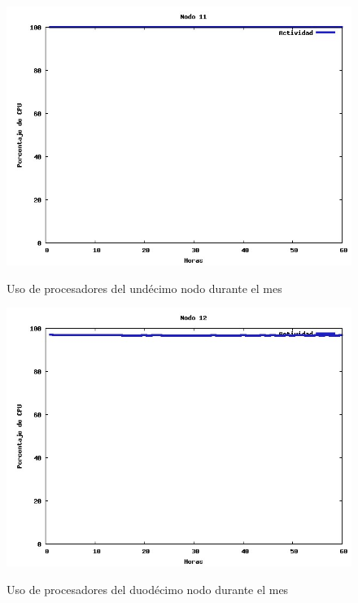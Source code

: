 \documentclass[11pt,a4paper,oneside,openany]{report}
\begin{document}
\begin{figure}[htb]
\centering
\includegraphics[width=0.9\linewidth]{grafico11.jpg}\\
\caption{Uso de procesadores del undécimo nodo durante el mes}
\end{figure}

\begin{figure}[htb]
\centering
\includegraphics[width=0.9\linewidth]{grafico12.jpg}\\
\caption{Uso de procesadores del duodécimo nodo durante el mes}
\end{figure}
\end{document}
